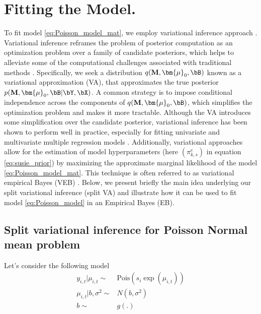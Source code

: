  


\section{Fitting the Model.  }

To fit model \ref{eq:Poisson_model_mat}, we employ variational inference approach \citep{blei_variational_2017}. Variational inference reframes the problem of posterior computation as an optimization problem over a family of candidate posteriors, which helps to alleviate some of the computational challenges associated with traditional methods \citep{blei_variational_2017}. Specifically, we seek a distribution $q(\mathbf{  M },\bm{\mu}_0, \bB )$  known as a variational approximation (VA), that approximates the true posterior $p(\mathbf{  M },\bm{\mu}_0, \bB |\bY,\bX)$. A common strategy is to impose conditional independence across the components of  $q(\mathbf{  M },\bm{\mu}_0, \bB )$, which simplifies the optimization problem and makes it more tractable.
Although the VA introduces some simplification over the candidate posterior, variational inference has been shown to perform well in practice, especially for fitting univariate and multivariate multiple regression models \citep{carbonetto_scalable_2012, zhang_improved_2021, morgante_flexible_2023}.  Additionally, variational approaches allow for the estimation of model hyperparameters (here  $  (\pi^e_{k,s})$ in equation \ref{eq:susie_prior}) by maximizing the approximate marginal likelihood of the model \ref{eq:Poisson_model_mat}. This technique is often referred to as variational empirical Bayes (VEB) \citep{blei_latent_2003}.  Below, we present briefly the main idea underlying our  split variational inference (split VA)  and illustrate how it can be used to fit model \ref{eq:Poisson_model} in an Empirical Bayes (EB). 
 
 
    
\subsection{Split variational inference for Poisson Normal mean problem}\label{subsec:pois_normal_mean}


Let's consider the following model 
\begin{align}
 y_{ i,t}|  \mu_{i,t}\sim & \text{Pois} \left(s_i\exp ( \mu_{i,t})\right)\label{eq:split_pb}\\
 \mu_{i,t}|b , \sigma^2 \sim & N(b, \sigma^2)\\
b\sim & g(.)
\end{align} 

